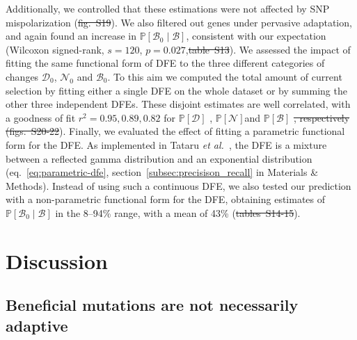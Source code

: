 \documentclass[10pt,letterpaper]{article}
\newcommand{\proba}{\mathbb{P}}
\newcommand{\SphyDel}{\mathcal{D}_0}
\newcommand{\SphyNeu}{\mathcal{N}_0}
\newcommand{\SphyBen}{\mathcal{B}_0}
\newcommand{\given}{\mid}
\newcommand{\SpopDel}{\mathcal{D}}
\newcommand{\SpopNeu}{\mathcal{N}}
\newcommand{\SpopBen}{\mathcal{B}}
\providecommand{\DIFaddtex}[1]{{\protect\color{blue}\uwave{#1}}} %
\providecommand{\DIFdeltex}[1]{{\protect\color{red}\sout{#1}}}                      %
\providecommand{\DIFaddbegin}{} %
\providecommand{\DIFaddend}{} %
\providecommand{\DIFdelbegin}{} %
\providecommand{\DIFdelend}{} %
\providecommand{\DIFadd}[1]{\texorpdfstring{\DIFaddtex{#1}}{#1}} %
\providecommand{\DIFdel}[1]{\texorpdfstring{\DIFdeltex{#1}}{}} %
\newcommand{\DIFscaledelfig}{0.5}
\newlength{\DIFdelgraphicswidth} %
\newlength{\DIFdelgraphicsheight} %
\newcommand{\DIFaddincludegraphics}[2][]{{\color{blue}\fbox{\DIFOincludegraphics[#1]{#2}}}} %
\newcommand{\DIFdelincludegraphics}[2][]{%
\sbox{\DIFdelgraphicsbox}{\DIFOincludegraphics[#1]{#2}}%
\settoboxwidth{\DIFdelgraphicswidth}{\DIFdelgraphicsbox} %
\settoboxtotalheight{\DIFdelgraphicsheight}{\DIFdelgraphicsbox} %
\scalebox{\DIFscaledelfig}{%
\parbox[b]{\DIFdelgraphicswidth}{\usebox{\DIFdelgraphicsbox}\\[-\baselineskip] \rule{\DIFdelgraphicswidth}{0em}}\llap{\resizebox{\DIFdelgraphicswidth}{\DIFdelgraphicsheight}{%
\setlength{\unitlength}{\DIFdelgraphicswidth}%
\begin{picture}(1,1)%
\thicklines\linethickness{2pt} %
{\color[rgb]{1,0,0}\put(0,0){\framebox(1,1){}}}%
{\color[rgb]{1,0,0}\put(0,0){\line( 1,1){1}}}%
{\color[rgb]{1,0,0}\put(0,1){\line(1,-1){1}}}%
\end{picture}%
}\hspace*{3pt}}} %
} %
\DeclareRobustCommand{\DIFaddbegin}{\DIFOaddbegin \let\includegraphics\DIFaddincludegraphics} %
\DeclareRobustCommand{\DIFaddend}{\DIFOaddend \let\includegraphics\DIFOincludegraphics} %
\DeclareRobustCommand{\DIFdelbegin}{\DIFOdelbegin \let\includegraphics\DIFdelincludegraphics} %
\DeclareRobustCommand{\DIFdelend}{\DIFOaddend \let\includegraphics\DIFOincludegraphics} %
\begin{document}
Additionally, we controlled that these estimations were not affected by SNP mispolarization (\DIFdelbegin \DIFdel{fig.~S19}\DIFdelend \DIFaddbegin {}\DIFaddend ).
We also filtered out genes under pervasive adaptation, and again found an increase in $\proba [ \SphyBen \given \SpopBen]$, consistent with our expectation (Wilcoxon signed-rank, $s=120$, $p=0.027$,\DIFdelbegin \DIFdel{table~S13}\DIFdelend \DIFaddbegin \DIFadd{~}\DIFaddend ).
We assessed the impact of fitting the same functional form of DFE to the three different categories of changes $\SphyDel$, $\SphyNeu$ and $\SphyBen$.
To this aim we computed the total amount of current selection by fitting either a single DFE on the whole dataset or by summing the other three independent DFEs.
These disjoint estimates are well correlated, with a goodness of fit $r^2={0.95, 0.89, 0.82}$ for \DIFaddbegin \DIFadd{respectively }\DIFaddend $\proba [\SpopDel]$ \DIFaddbegin \DIFadd{(}\DIFadd{)}\DIFaddend , $\proba [\SpopNeu]$\DIFaddbegin \DIFadd{(}\DIFadd{) }\DIFaddend and $\proba [\SpopBen]$ \DIFdelbegin \DIFdel{, respectively (figs.~S20-22}\DIFdelend \DIFaddbegin \DIFadd{(}\DIFaddend ).
Finally, we evaluated the effect of fitting a parametric functional form for the DFE.
As implemented in Tataru \textit{et al.}~\cite{tataru_inference_2017}, the DFE is a mixture between a reflected gamma distribution and an exponential distribution (eq.~\ref{eq:parametric-dfe}, section~\ref{subsec:precisison_recall} in Materials \& Methods).
Instead of using such a continuous DFE, we also tested our prediction with a non-parametric functional form for the DFE, obtaining estimates of $\proba [ \SphyBen \given \SpopBen]$ in the 8--94\% range, with a mean of 43\% (\DIFdelbegin \DIFdel{tables~S14-15}\DIFdelend \DIFaddbegin {}\DIFadd{, }\DIFaddend ).

\section*{Discussion}
\subsection*{Beneficial mutations are not necessarily adaptive}
\end{document}
